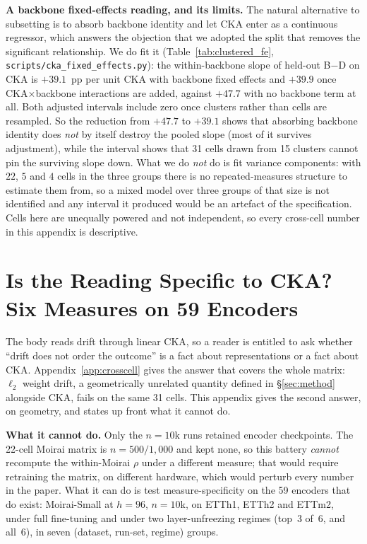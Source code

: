 \textbf{A backbone fixed-effects reading, and its limits.} The natural
alternative to subsetting is to absorb backbone identity and let CKA enter as a
continuous regressor, which answers the objection that we adopted the split that
removes the significant relationship. We do fit it
(Table~\ref{tab:clustered_fe}, \texttt{scripts/cka\_fixed\_effects.py}): the
within-backbone slope of held-out B$-$D on CKA is $+39.1$~pp per unit CKA with
backbone fixed effects and $+39.9$ once CKA${\times}$backbone interactions are
added, against $+47.7$ with no backbone term at all. Both adjusted intervals
include zero once clusters rather than cells are resampled. So the reduction from
$+47.7$ to $+39.1$ shows that absorbing backbone identity does \emph{not} by
itself destroy the pooled slope (most of it survives adjustment), while the
interval shows that 31 cells drawn from 15 clusters cannot pin the surviving
slope down. What we do \emph{not} do is fit variance components: with $22$, $5$
and $4$ cells in the three groups there is no repeated-measures structure to
estimate them from, so a mixed model over three groups of that size is not
identified and any interval it produced would be an artefact of the
specification. Cells here are unequally powered and not independent, so every
cross-cell number in this appendix is descriptive.

\section{Is the Reading Specific to CKA? Six Measures on 59 Encoders}
\label{app:driftmetrics}

The body reads drift through linear CKA, so a reader is entitled to ask whether
``drift does not order the outcome'' is a fact about representations or a fact
about CKA. Appendix~\ref{app:crosscell} gives the answer that covers the whole
matrix: $\ell_2$ weight drift, a geometrically unrelated quantity defined in
\S\ref{sec:method} alongside CKA, fails on the same 31 cells. This appendix
gives the second answer, on geometry, and states up front what it cannot do.

\textbf{What it cannot do.} Only the $n{=}10$k runs retained encoder
checkpoints. The 22-cell Moirai matrix is $n{=}500/1{,}000$ and kept none, so
this battery \emph{cannot} recompute the within-Moirai $\rho$ under a different
measure; that would require retraining the matrix, on different hardware, which
would perturb every number in the paper. What it can do is test
measure-specificity on the 59 encoders that do exist: Moirai-Small at $h{=}96$,
$n{=}10$k, on ETTh1, ETTh2 and ETTm2, under full fine-tuning and under two
layer-unfreezing regimes (top~3 of~6, and all~6), in seven
(dataset, run-set, regime) groups.

